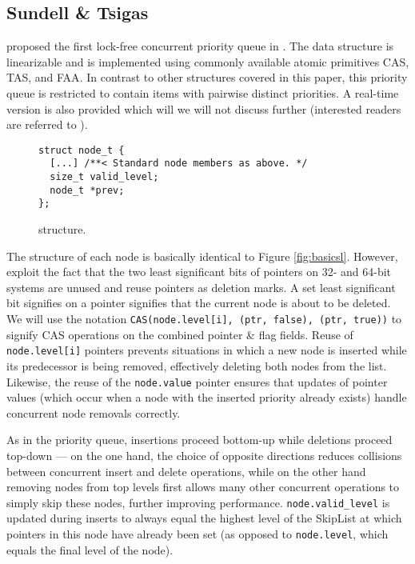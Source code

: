 \documentclass[a4paper,10pt]{article}
\begin{document}
\subsection{Sundell \& Tsigas} \label{sec:sundell}

\citeauthor{sundell2003fast} proposed the first lock-free concurrent priority queue in
\citeyear{sundell2003fast} \cite{sundell2003fast}. The data structure is linearizable
and is implemented using commonly available atomic primitives \ac{CAS}, \ac{TAS}, and \ac{FAA}.
In contrast to other structures covered in this paper, this priority queue is restricted to
contain items with pairwise distinct priorities.
A real-time version is also provided which will we will not discuss further (interested readers are
referred to \cite{sundell2003fast}).

\begin{figure}[h]
\begin{lstlisting}
struct node_t {
  [...] /**< Standard node members as above. */
  size_t valid_level;
  node_t *prev;
};
\end{lstlisting}
\caption{\citeauthor{sundell2003fast} structure.}
\label{fig:slsl}
\end{figure}

The structure of each node is basically identical to Figure \ref{fig:basicsl}. However, \citeauthor{sundell2003fast}
exploit the fact that the two least significant bits of pointers on 32- and 64-bit systems
are unused and reuse pointers as deletion marks. A set least significant bit signifies on a pointer signifies
that the current node is about to be deleted. We will use the notation 
\lstinline|CAS(node.level[i], (ptr, false), (ptr, true))| to signify \ac{CAS} operations on the
combined pointer \& flag fields.
Reuse of \lstinline|node.level[i]| pointers
prevents situations in which a new node is inserted while its predecessor is being removed,
effectively deleting both nodes from the list. Likewise, the reuse of the \lstinline|node.value|
pointer ensures that updates of pointer values (which occur when a node with the inserted priority already exists)
handle concurrent node removals correctly.

As in the \citeauthor{shavit2000skiplist} priority queue, insertions proceed bottom-up while
deletions proceed top-down --- on the one hand, the choice of opposite directions reduces collisions
between concurrent insert and delete operations, while on the other hand removing nodes from top levels first
allows many other concurrent operations to simply skip these nodes, further improving performance.
\lstinline|node.valid_level| is updated during inserts to always equal the highest level of the SkipList
at which pointers in this node have already been set (as opposed to \lstinline|node.level|, which equals
the final level of the node).
\end{document}

